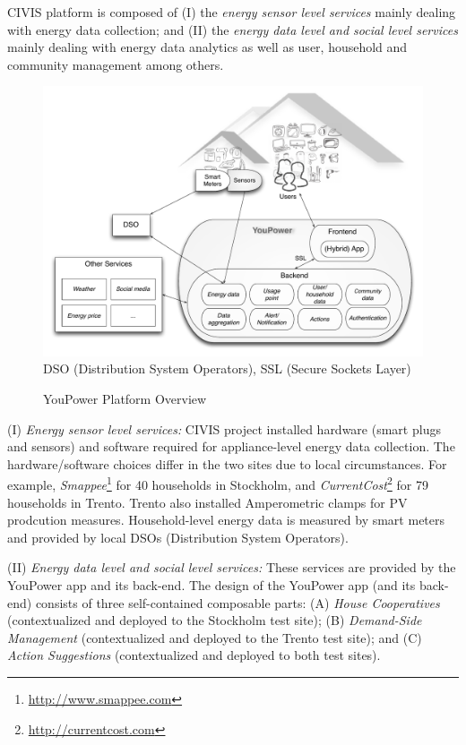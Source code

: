 CIVIS platform is composed of (I) the \textit{energy sensor level services} mainly
dealing with energy data collection; and (II) the \textit{energy data level and social
level services} mainly dealing with energy data analytics as well as user, household and community management
among others. 

\begin{figure}[h!]
\begin{center}\footnotesize
	\includegraphics[width=1.0\linewidth]{img/civis_platform_overview.pdf}\\
	DSO (Distribution System Operators),  SSL (Secure Sockets Layer)
	\caption{YouPower Platform Overview}\label{fig:platform}
\end{center}
\end{figure}

(I) \textit{Energy sensor level services:} CIVIS project installed hardware (smart plugs and sensors) and
software required for appliance-level energy data collection. The hardware/software choices differ in the
two sites due to local circumstances. For example, \textit{Smappee}\footnote{\url{http://www.smappee.com}}
for 40 households in Stockholm, and \textit{CurrentCost}\footnote{\url{http://currentcost.com}} for 79
households in Trento. Trento also installed Amperometric clamps for PV prodcution measures. 
Household-level energy data is measured by smart meters and provided by local DSOs (Distribution System Operators). 

(II) \textit{Energy data level and social level services:} These services are provided by the YouPower
app and its back-end. The design of the YouPower app (and its back-end) consists of three self-contained
composable parts: (A) \textit{House Cooperatives} (contextualized and deployed to the Stockholm test site);
(B) \textit{Demand-Side Management} (contextualized and deployed
to the Trento test site); and (C) \textit{Action Suggestions} (contextualized and deployed to both test sites).



